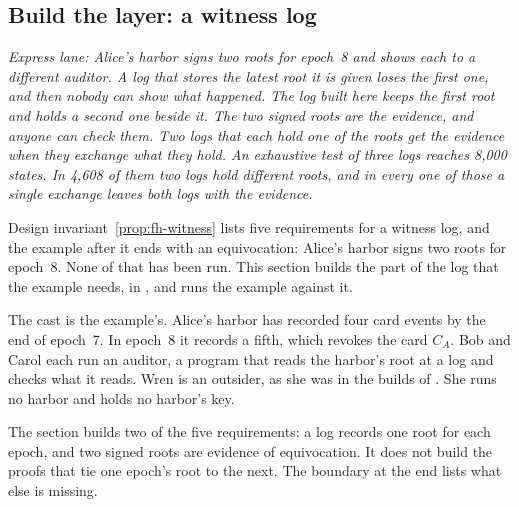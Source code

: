 %
%
\subsection{Build the layer: a witness log}
\label{sec:fh-log}

\noindent\emph{Express lane: Alice's harbor signs two roots for epoch~8
and shows each to a different auditor. A log that stores the latest root
it is given loses the first one, and then nobody can show what happened. The log
built here keeps the first root and holds a second one beside it. The two
signed roots are the evidence, and anyone can check them. Two logs that
each hold one of the roots get the evidence when they exchange what they
hold. An exhaustive test of three logs reaches 8,000 states. In 4,608 of
them two logs hold different roots, and in every one of those a single
exchange leaves both logs with the evidence.}

Design invariant~\ref{prop:fh-witness} lists five requirements for a
witness log, and the example after it ends with an equivocation: Alice's
harbor signs two roots for epoch~8. None of that has been run. This section builds the
part of the log that the example needs, in \pdkernelname{}, and runs the
example against it.

The cast is the example's. Alice's harbor has recorded four card events
by the end of epoch~7. In epoch~8 it records a fifth, which revokes the
card $C_A$. Bob and Carol each run an auditor, a program that reads the
harbor's root at a log and checks what it reads. Wren is an outsider, as
she was in the builds of . She
runs no harbor and holds no harbor's key.

The section builds two of the five requirements: a log records one root
for each epoch, and two signed roots are evidence of equivocation. It does
not build the proofs that tie one epoch's root to the next. The boundary at
the end lists what else is missing.

